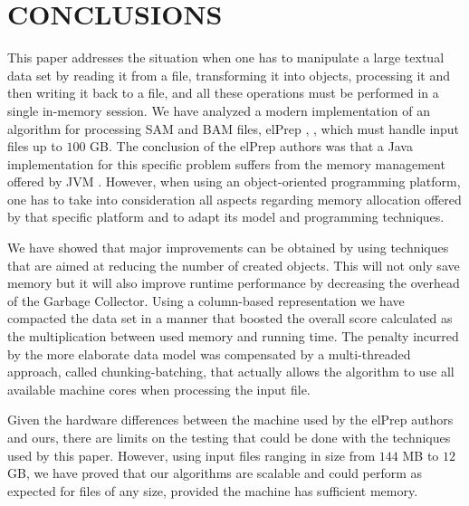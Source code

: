 \documentclass[a4paper,twoside]{article}
\begin{document}
\section{\uppercase{Conclusions}}
\label{sec:conclusions}
This paper addresses the situation when one has to manipulate a large textual data set by reading it from a file, transforming it into objects, processing it and then writing it back to a file, and all these operations must be performed in a single in-memory session.
We have analyzed a modern implementation of an algorithm for processing SAM and BAM files, elPrep \cite{herzeel:2015}, \cite{herzeel:2019}, which must handle input files up to $100$ GB.
The conclusion of the elPrep authors was that a Java implementation for this specific problem suffers from the memory management offered by JVM \cite{costanza:2019}.
However, when using an object-oriented programming platform, one has to take into consideration all aspects regarding memory allocation offered by that specific platform and to adapt its model and programming techniques.

We have showed that major improvements can be obtained by using techniques that are aimed at reducing the number of created objects.
This will not only save memory but it will also improve runtime performance by decreasing the overhead of the Garbage Collector.
Using a column-based representation we have compacted the data set in a manner that boosted the overall score calculated as the multiplication between used memory and running time.
The penalty incurred by the more elaborate data model was compensated by a multi-threaded approach, called chunking-batching, that actually allows the algorithm to use all available machine cores when processing the input file.

Given the hardware differences between the machine used by the elPrep authors and ours, there are limits on the testing that could be done with the techniques used by this paper.
However, using input files ranging in size from $144$ MB to $12$ GB, we have proved that our algorithms are scalable and could perform as expected for files of any size, provided the machine has sufficient memory.






{\small
}
\end{document}
